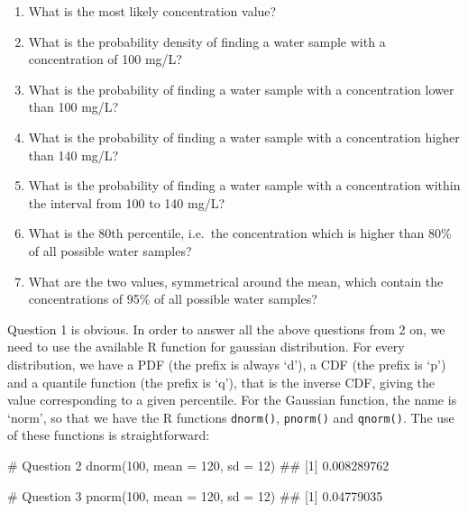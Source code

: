\documentclass[a4paper,12pt,oneside]{book}
\providecommand{\tightlist}{%
  \setlength{\itemsep}{0pt}\setlength{\parskip}{0pt}}
\newenvironment{Shaded}{\begin{snugshade}}{\end{snugshade}}
\newcommand{\DecValTok}[1]{#1}
\newcommand{\CommentTok}[1]{#1}
\newcommand{\DocumentationTok}[1]{#1}
\newcommand{\FunctionTok}[1]{#1}
\newcommand{\AttributeTok}[1]{#1}
\newcommand{\NormalTok}[1]{#1}
\begin{document}
\begin{enumerate}
\def\labelenumi{\arabic{enumi}.}
\tightlist
\item
  What is the most likely concentration value?
\item
  What is the probability density of finding a water sample with a concentration of 100 mg/L?
\item
  What is the probability of finding a water sample with a concentration lower than 100 mg/L?
\item
  What is the probability of finding a water sample with a concentration higher than 140 mg/L?
\item
  What is the probability of finding a water sample with a concentration within the interval from 100 to 140 mg/L?
\item
  What is the 80th percentile, i.e.~the concentration which is higher than 80\% of all possible water samples?
\item
  What are the two values, symmetrical around the mean, which contain the concentrations of 95\% of all possible water samples?
\end{enumerate}

Question 1 is obvious. In order to answer all the above questions from 2 on, we need to use the available R function for gaussian distribution. For every distribution, we have a PDF (the prefix is always `d'), a CDF (the prefix is `p') and a quantile function (the prefix is `q'), that is the inverse CDF, giving the value corresponding to a given percentile. For the Gaussian function, the name is `norm', so that we have the R functions \texttt{dnorm()}, \texttt{pnorm()} and \texttt{qnorm()}. The use of these functions is straightforward:

\begin{Shaded}
\begin{Highlighting}[]
\CommentTok{\# Question 2}
\FunctionTok{dnorm}\NormalTok{(}\DecValTok{100}\NormalTok{, }\AttributeTok{mean =} \DecValTok{120}\NormalTok{, }\AttributeTok{sd =} \DecValTok{12}\NormalTok{)}
\DocumentationTok{\#\# [1] 0.008289762}
\end{Highlighting}
\end{Shaded}

\begin{Shaded}
\begin{Highlighting}[]
\CommentTok{\# Question 3}
\FunctionTok{pnorm}\NormalTok{(}\DecValTok{100}\NormalTok{, }\AttributeTok{mean =} \DecValTok{120}\NormalTok{, }\AttributeTok{sd =} \DecValTok{12}\NormalTok{)}
\DocumentationTok{\#\# [1] 0.04779035}
\end{Highlighting}
\end{Shaded}
\end{document}
